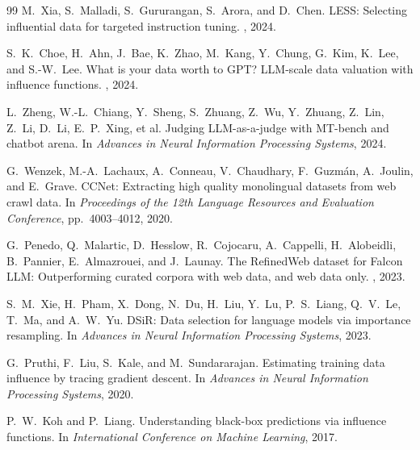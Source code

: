 \documentclass[12pt,a4paper]{article}
\theoremstyle{remark}
\begin{document}
\begin{thebibliography}{99}
M.\ Xia, S.\ Malladi, S.\ Gururangan, S.\ Arora, and D.\ Chen.
\newblock LESS: Selecting influential data for targeted instruction tuning.
, 2024.

S.\ K.\ Choe, H.\ Ahn, J.\ Bae, K.\ Zhao, M.\ Kang, Y.\ Chung, G.\ Kim, K.\ Lee, and S.-W.\ Lee.
\newblock What is your data worth to GPT? LLM-scale data valuation with influence functions.
, 2024.

L.\ Zheng, W.-L.\ Chiang, Y.\ Sheng, S.\ Zhuang, Z.\ Wu, Y.\ Zhuang, Z.\ Lin, Z.\ Li, D.\ Li, E.\ P.\ Xing, et al.
\newblock Judging LLM-as-a-judge with MT-bench and chatbot arena.
\newblock In {\em Advances in Neural Information Processing Systems}, 2024.

G.\ Wenzek, M.-A.\ Lachaux, A.\ Conneau, V.\ Chaudhary, F.\ Guzm\'{a}n, A.\ Joulin, and E.\ Grave.
\newblock CCNet: Extracting high quality monolingual datasets from web crawl data.
\newblock In {\em Proceedings of the 12th Language Resources and Evaluation Conference}, pp.\ 4003--4012, 2020.

G.\ Penedo, Q.\ Malartic, D.\ Hesslow, R.\ Cojocaru, A.\ Cappelli, H.\ Alobeidli, B.\ Pannier, E.\ Almazrouei, and J.\ Launay.
\newblock The RefinedWeb dataset for Falcon LLM: Outperforming curated corpora with web data, and web data only.
, 2023.

S.\ M.\ Xie, H.\ Pham, X.\ Dong, N.\ Du, H.\ Liu, Y.\ Lu, P.\ S.\ Liang, Q.\ V.\ Le, T.\ Ma, and A.\ W.\ Yu.
\newblock DSiR: Data selection for language models via importance resampling.
\newblock In {\em Advances in Neural Information Processing Systems}, 2023.

G.\ Pruthi, F.\ Liu, S.\ Kale, and M.\ Sundararajan.
\newblock Estimating training data influence by tracing gradient descent.
\newblock In {\em Advances in Neural Information Processing Systems}, 2020.

P.\ W.\ Koh and P.\ Liang.
\newblock Understanding black-box predictions via influence functions.
\newblock In {\em International Conference on Machine Learning}, 2017.

\end{thebibliography}
\end{document}
